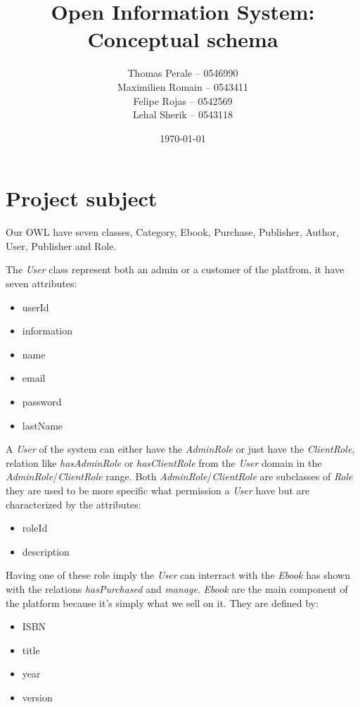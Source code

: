 \documentclass[a4paper,11pt]{article}
\begin{document}
\title{Open Information System: Conceptual schema}
\author{Thomas Perale -- 0546990\\Maximilien Romain -- 0543411\\Felipe Rojas -- 0542569\\Lehal Sherik -- 0543118}
\date{\today}

\maketitle

\section{Project subject}

Our OWL have seven classes, Category, Ebook, Purchase, Publisher, Author, User, Publisher and Role.

The \emph{User} class represent both an admin or a customer of the platfrom, it have seven attributes:

\begin{itemize}
  \item userId
  \item information
  \item name
  \item email
  \item password
  \item lastName
\end{itemize}

A \emph{User} of the system can either have the \emph{AdminRole} or just have the \emph{ClientRole},
relation like \emph{hasAdminRole} or \emph{hasClientRole} from the \emph{User} domain in the
\emph{AdminRole}/\emph{ClientRole} range.
Both \emph{AdminRole}/\emph{ClientRole} are subclasses of \emph{Role} they are used to be more specific
what permission a \emph{User} have but are characterized by the attributes:

\begin{itemize}
  \item roleId
  \item description
\end{itemize}

Having one of these role imply the \emph{User} can interract with the \emph{Ebook} has shown with
the relations \emph{hasPurchased} and \emph{manage}. \emph{Ebook} are the main component of the platform
because it's simply what we sell on it. They are defined by:

\begin{itemize}
  \item ISBN
  \item title
  \item year
  \item version
\end{itemize}
\end{document}
